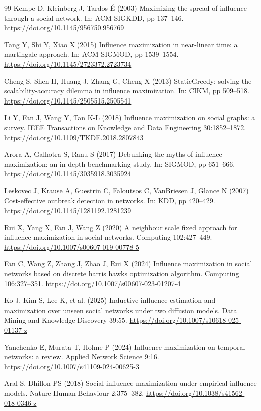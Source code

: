 \begin{thebibliography}{99}
 Kempe D, Kleinberg J, Tardos É (2003) Maximizing the spread of influence through a social network. In: ACM SIGKDD, pp 137--146. \url{https://doi.org/10.1145/956750.956769}

 Tang Y, Shi Y, Xiao X (2015) Influence maximization in near-linear time: a martingale approach. In: ACM SIGMOD, pp 1539--1554. \url{https://doi.org/10.1145/2723372.2723734}

 Cheng S, Shen H, Huang J, Zhang G, Cheng X (2013) StaticGreedy: solving the scalability-accuracy dilemma in influence maximization. In: CIKM, pp 509--518. \url{https://doi.org/10.1145/2505515.2505541}

 Li Y, Fan J, Wang Y, Tan K-L (2018) Influence maximization on social graphs: a survey. IEEE Transactions on Knowledge and Data Engineering 30:1852--1872. \url{https://doi.org/10.1109/TKDE.2018.2807843}

 Arora A, Galhotra S, Ranu S (2017) Debunking the myths of influence maximization: an in-depth benchmarking study. In: SIGMOD, pp 651--666. \url{https://doi.org/10.1145/3035918.3035924}

 Leskovec J, Krause A, Guestrin C, Faloutsos C, VanBriesen J, Glance N (2007) Cost-effective outbreak detection in networks. In: KDD, pp 420--429. \url{https://doi.org/10.1145/1281192.1281239}

 Rui X, Yang X, Fan J, Wang Z (2020) A neighbour scale fixed approach for influence maximization in social networks. Computing 102:427--449. \url{https://doi.org/10.1007/s00607-019-00778-5}

 Fan C, Wang Z, Zhang J, Zhao J, Rui X (2024) Influence maximization in social networks based on discrete harris hawks optimization algorithm. Computing 106:327--351. \url{https://doi.org/10.1007/s00607-023-01207-4}

 Ko J, Kim S, Lee K, et al. (2025) Inductive influence estimation and maximization over unseen social networks under two diffusion models. Data Mining and Knowledge Discovery 39:55. \url{https://doi.org/10.1007/s10618-025-01137-z}

 Yanchenko E, Murata T, Holme P (2024) Influence maximization on temporal networks: a review. Applied Network Science 9:16. \url{https://doi.org/10.1007/s41109-024-00625-3}

 Aral S, Dhillon PS (2018) Social influence maximization under empirical influence models. Nature Human Behaviour 2:375--382. \url{https://doi.org/10.1038/s41562-018-0346-z}


\end{thebibliography}

